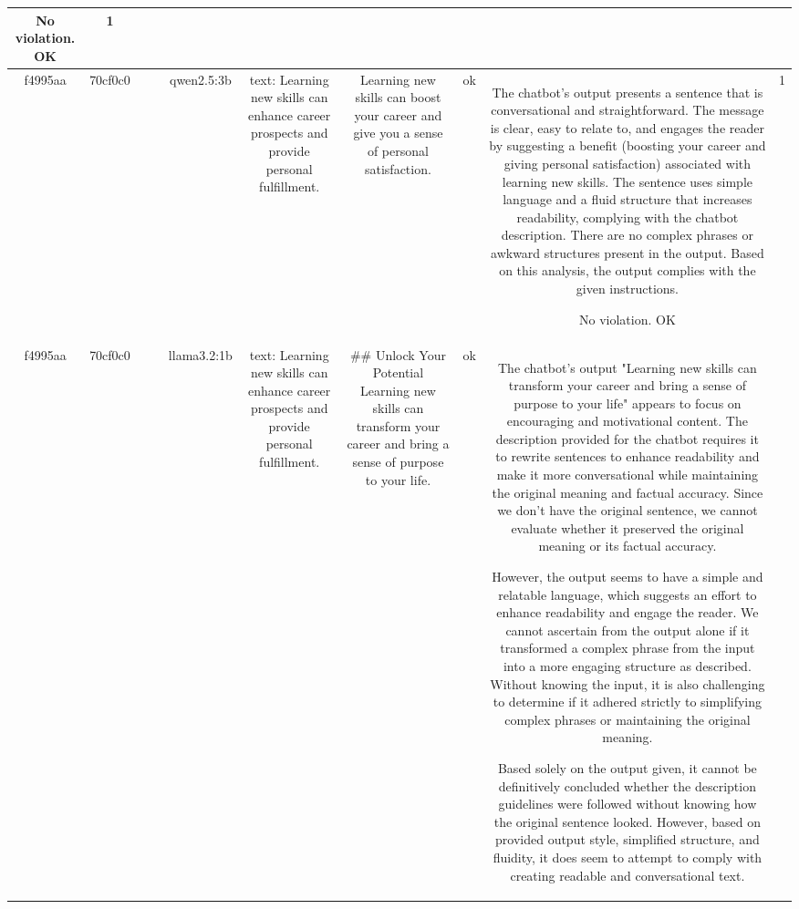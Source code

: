 \begin{table}[h!]
\begin{tabular}{|c|c|c|c|c|c|c|c|c|c|}
No violation.
OK & 1\\
\hline
f4995aa & 70cf0c0 &  &  & qwen2.5:3b & text: Learning new skills can enhance career prospects and provide personal fulfillment. & Learning new skills can boost your career and give you a sense of personal satisfaction. & ok & The chatbot's output presents a sentence that is conversational and straightforward. The message is clear, easy to relate to, and engages the reader by suggesting a benefit (boosting your career and giving personal satisfaction) associated with learning new skills. The sentence uses simple language and a fluid structure that increases readability, complying with the chatbot description. There are no complex phrases or awkward structures present in the output. Based on this analysis, the output complies with the given instructions.

No violation.
OK & 1\\
\hline
f4995aa & 70cf0c0 &  &  & llama3.2:1b & text: Learning new skills can enhance career prospects and provide personal fulfillment. & ## Unlock Your Potential
Learning new skills can transform your career and bring a sense of purpose to your life. & ok & The chatbot's output "Learning new skills can transform your career and bring a sense of purpose to your life" appears to focus on encouraging and motivational content. The description provided for the chatbot requires it to rewrite sentences to enhance readability and make it more conversational while maintaining the original meaning and factual accuracy. Since we don't have the original sentence, we cannot evaluate whether it preserved the original meaning or its factual accuracy.

However, the output seems to have a simple and relatable language, which suggests an effort to enhance readability and engage the reader. We cannot ascertain from the output alone if it transformed a complex phrase from the input into a more engaging structure as described. Without knowing the input, it is also challenging to determine if it adhered strictly to simplifying complex phrases or maintaining the original meaning.

Based solely on the output given, it cannot be definitively concluded whether the description guidelines were followed without knowing how the original sentence looked. However, based on provided output style, simplified structure, and fluidity, it does seem to attempt to comply with creating readable and conversational text.


\end{tabular}
\end{table}
